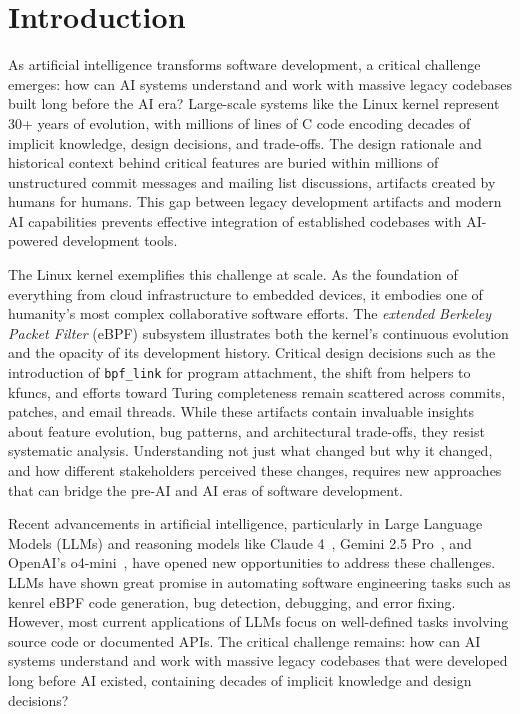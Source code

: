 \documentclass[sigconf,review,anonymous]{acmart}
\begin{document}
\maketitle

\section{Introduction}

As artificial intelligence transforms software development, a critical challenge emerges: how can AI systems understand and work with massive legacy codebases built long before the AI era? Large-scale systems like the Linux kernel represent 30+ years of evolution, with millions of lines of C code encoding decades of implicit knowledge, design decisions, and trade-offs. The design rationale and historical context behind critical features are buried within millions of unstructured commit messages and mailing list discussions, artifacts created by humans for humans. This gap between legacy development artifacts and modern AI capabilities prevents effective integration of established codebases with AI-powered development tools.

The Linux kernel exemplifies this challenge at scale. As the foundation of everything from cloud infrastructure to embedded devices, it embodies one of humanity's most complex collaborative software efforts. The \textit{extended Berkeley Packet Filter} (eBPF)\cite{ebpf} subsystem illustrates both the kernel's continuous evolution and the opacity of its development history. Critical design decisions such as the introduction of \texttt{bpf\_link}\cite{bpflink} for program attachment, the shift from helpers to kfuncs\cite{kfuncs}, and efforts toward Turing completeness remain scattered across commits, patches, and email threads. While these artifacts contain invaluable insights about feature evolution, bug patterns, and architectural trade-offs, they resist systematic analysis. Understanding not just what changed but why it changed, and how different stakeholders perceived these changes, requires new approaches that can bridge the pre-AI and AI eras of software development.

Recent advancements in artificial intelligence, particularly in Large Language Models (LLMs) and reasoning models like Claude 4~\cite{claude4}, Gemini 2.5 Pro~\cite{gemini25}, and OpenAI's o4-mini~\cite{o4mini}, have opened new opportunities to address these challenges. LLMs have shown great promise in automating software engineering tasks such as kenrel eBPF code generation\cite{zheng2024kgent}, bug detection\cite{li2024enhancing}, debugging\cite{chen2023teaching}, and error fixing\cite{deligiannis2023fixing}. However, most current applications of LLMs focus on well-defined tasks involving source code or documented APIs. The critical challenge remains: how can AI systems understand and work with massive legacy codebases that were developed long before AI existed, containing decades of implicit knowledge and design decisions?
\end{document}
